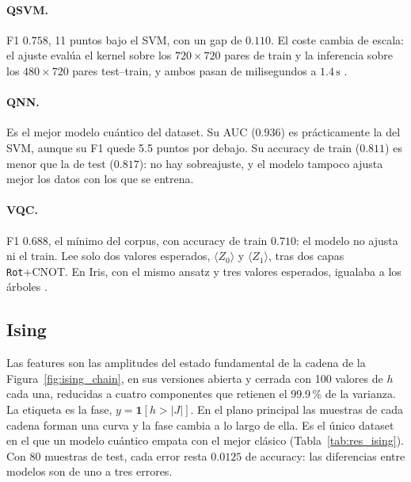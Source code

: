 \paragraph{QSVM.} F1 $0.758$, 11 puntos bajo el SVM, con un gap de $0.110$. El coste cambia de escala: el ajuste evalúa el kernel sobre los $720\times720$ pares de train y la inferencia sobre los $480\times720$ pares test--train, y ambos pasan de milisegundos a $1.4\,\mathrm{s}$ \citep{schuld2021}.

\paragraph{QNN.} Es el mejor modelo cuántico del dataset. Su AUC ($0.936$) es prácticamente la del SVM, aunque su F1 quede 5.5 puntos por debajo. Su accuracy de train ($0.811$) es menor que la de test ($0.817$): no hay sobreajuste, y el modelo tampoco ajusta mejor los datos con los que se entrena.

\paragraph{VQC.} F1 $0.688$, el mínimo del corpus, con accuracy de train $0.710$: el modelo no ajusta ni el train. Lee solo dos valores esperados, $\langle Z_0\rangle$ y $\langle Z_1\rangle$, tras dos capas \texttt{Rot}+CNOT. En Iris, con el mismo ansatz y tres valores esperados, igualaba a los árboles \citep{cerezo2021}.

\subsection{Ising}

Las features son las amplitudes del estado fundamental de la cadena de la Figura~\ref{fig:ising_chain}, en sus versiones abierta y cerrada con 100 valores de $h$ cada una, reducidas a cuatro componentes que retienen el 99.9\,\% de la varianza. La etiqueta es la fase, $y=\mathbf{1}[h>|J|]$. En el plano principal las muestras de cada cadena forman una curva y la fase cambia a lo largo de ella. Es el único dataset en el que un modelo cuántico empata con el mejor clásico (Tabla~\ref{tab:res_ising}). Con 80 muestras de test, cada error resta $0.0125$ de accuracy: las diferencias entre modelos son de uno a tres errores.

